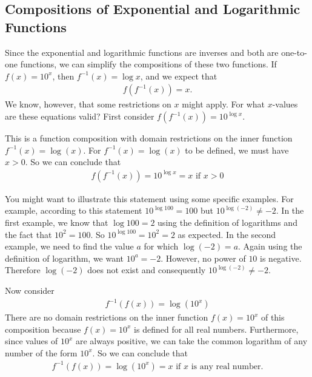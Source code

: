 \documentclass[10pt,]{book}
\theoremstyle{ptxdefinitionnotitle}
\theoremstyle{ptxdefinitiontitle}
\theoremstyle{ptxdefinitionnotitle}
\theoremstyle{ptxdefinitiontitle}
\theoremstyle{ptxdefinitionnotitle}
\theoremstyle{ptxdefinitiontitle}
\numberwithin{equation}{section}
\newcommand{\gt}{>}
\begin{document}
\subsection[{Compositions of Exponential and Logarithmic Functions}]{Compositions of Exponential and Logarithmic Functions}\label{subsection-3}
\hypertarget{p-331}{}%
Since the exponential and logarithmic functions are inverses and both are one-to-one functions, we can simplify the compositions of these two functions.  If \(f(x) = 10^x\), then \(f^{-1} (x) = \log x \), and we expect that%
\begin{gather*}
f \left( f^{-1} (x) \right) = x.
\end{gather*}
We know, however, that some restrictions on \(x\) might apply.  For what \(x\)-values are these equations valid?  First consider \(f \left( f^{-1} (x) \right) = 10^{\log x}\).%
\par
\hypertarget{p-332}{}%
This is a function composition with domain restrictions on the inner function \(f^{-1} (x) = \log \left( x \right)\). For \(f^{-1} (x) = \log \left( x \right)\) to be defined, we must have \(x \gt 0\). So we can conclude that%
\begin{gather*}
f \left( f^{-1} (x) \right) = 10^{\log x} = x \text{ if } x \gt 0
\end{gather*}
%
\par
\hypertarget{p-333}{}%
You might want to illustrate this statement using some specific examples. For example, according to this statement \(10^{\log 100} = 100\) but \(10^{\log(-2)} \neq -2\). In the first example, we know that \(\log 100 = 2\) using the definition of logarithms and the fact that \(10^2 = 100\). So \(10^{\log 100} = 10^2 = 2\) as expected. In the second example, we need to find the value \(a\) for which \(\log \left( -2 \right) = a\). Again using the definition of logarithm, we want \(10^a = -2\). However, no power of \(10\) is negative. Therefore \(\log \left( -2 \right)\) does not exist and consequently \(10^{\log (-2) } \neq -2\).%
\par
\hypertarget{p-334}{}%
Now consider%
\begin{gather*}
f^{-1} \left( f (x) \right) = \log \left( 10^x \right)
\end{gather*}
There are no domain restrictions on the inner function \(f(x) = 10^x \) of this composition because \(f(x) = 10^x\) is defined for all real numbers. Furthermore, since values of \(10^x\) are always positive, we can take the common logarithm of any number of the form \(10^x\). So we can conclude that%
\begin{gather*}
f^{-1} \left( f (x) \right) = \log \left( 10^x \right) = x \text{ if } x \text{ is any real number.}
\end{gather*}
\end{document}

